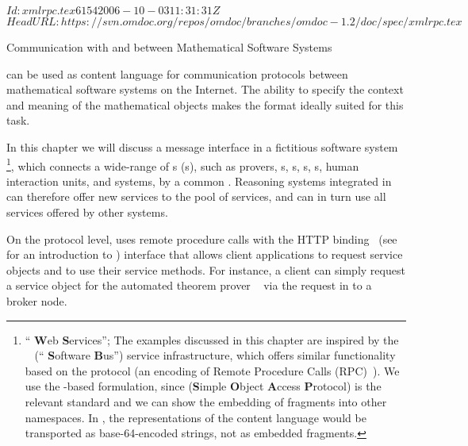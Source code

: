 \svnInfo $Id: xmlrpc.tex 6154 2006-10-03 11:31:31Z  $
\svnKeyword $HeadURL: https://svn.omdoc.org/repos/omdoc/branches/omdoc-1.2/doc/spec/xmlrpc.tex $

\begin{tchapter}[id=rpc,short=Communication between Systems]{Communication with and between Mathematical Software Systems}

{\omdoc} can be used as content language for communication protocols between
mathematical software systems on the Internet. The ability to specify the context
and meaning of the mathematical objects makes the {\omdoc} format ideally suited
for this task.

In this chapter we will discuss a message interface in a fictitious software system
{\mathwebws}\footnote{``{\mathweb} {\bf{W}}eb {\bf{S}}ervices''; The examples discussed in
  this chapter are inspired by the {\mathwebsb}~\cite{FraKoh:mabdl99,ZimKoh:tmsbdmr02}
  (``{\mathweb} {\bf{S}}oftware {\bf{B}}us'') service infrastructure, which offers similar
  functionality based on the {\xmlrpc} protocol (an {\xml} encoding of Remote Procedure
  Calls (RPC)~\cite{xmlrpc}). We use the {\soap}-based formulation, since {\soap}
  ({\bf{S}}imple {\bf{O}}bject {\bf{A}}ccess {\bf{P}}rotocol) is the relevant
  {} standard and we can show the embedding of {\omdoc} fragments into other
  {\xml} namespaces. In {\xmlrpc}, the {\xml} representations of the content language
  {\omdoc} would be transported as base-64-encoded strings, not as embedded {\xml}
  fragments. }, which connects a wide-range of {s}
({s}), such as { {prover}s},
{s}, {s},
{s}, {s}, human interaction units,
and { {system}s}, by a common
{}.  Reasoning systems integrated in {\mathwebws} can
therefore offer new services to the pool of services, and can in turn use all services
offered by other systems.

On the protocol level, {\mathwebws} uses {\soap} remote procedure calls with the HTTP
binding~\cite{GudHad:soapad03} (see~\cite{Mitra:soapPrimer03} for an introduction to
{\soap}) interface that allows client applications to request service objects and to use
their service methods. For instance, a client can simply request a service object for the
automated theorem prover {\spass}~\cite{Weidenbach:sv97} via the {\http} {}
request in {} to a {\mathwebws} broker node.


\end{tchapter}
